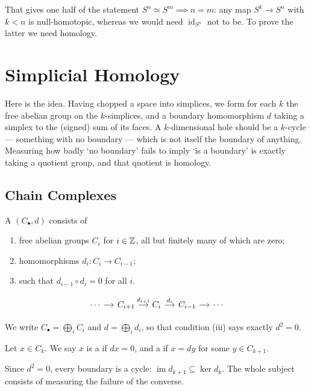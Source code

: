 \documentclass[a4paper]{scrartcl}
\newcommand{\id}{\operatorname{id}}
\begin{document}
That gives one half of the statement $S^n \simeq S^m \implies n = m$: any map $S^k \to S^n$
with $k < n$ is null-homotopic, whereas we would need $\id_{S^n}$ not to be. To prove
the latter we need homology.

\section{Simplicial Homology}

Here is the idea. Having chopped a space into simplices, we form for each $k$ the free
abelian group on the $k$-simplices, and a boundary homomorphism $d$ taking a simplex to
the (signed) sum of its faces. A $k$-dimensional hole should be a $k$-cycle --- something
with no boundary --- which is not itself the boundary of anything. Measuring how badly
`no boundary' fails to imply `is a boundary' is exactly taking a quotient group, and that
quotient is homology.

\subsection{Chain Complexes}

\begin{definition}
	A  $(C_\bullet, d)$ consists of
	\begin{enumerate}
		\item free abelian groups $C_i$ for $i \in \mathbb{Z}$, all but finitely many of which are zero;
		\item homomorphisms $d_i: C_i \to C_{i-1}$;
		\item such that $d_{i-1}\circ d_i = 0$ for all $i$.
	\end{enumerate}
	\[\begin{tikzcd}[column sep=small]
		\cdots \arrow[r] & {C_{i+1}} \arrow[r, "{d_{i+1}}"] & {C_i} \arrow[r, "{d_i}"] & {C_{i-1}} \arrow[r] & \cdots
	\end{tikzcd}\]
\end{definition}

We write $C_\bullet = \bigoplus_i C_i$ and $d = \bigoplus_i d_i$, so that condition (iii)
says exactly $d^2 = 0$.

\begin{definition}
	Let $x \in C_k$. We say $x$ is a  if $dx = 0$, and a  if $x = dy$ for some $y \in C_{k+1}$.
\end{definition}

Since $d^2 = 0$, every boundary is a cycle: $\operatorname{im}d_{k+1} \subseteq \ker d_k$.
The whole subject consists of measuring the failure of the converse.
\end{document}
